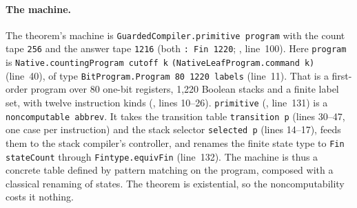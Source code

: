 \paragraph{The machine.} The theorem's machine is
\texttt{GuardedCompiler.primitive program} with the count tape
\texttt{256} and the answer tape \texttt{1216} (both \texttt{: Fin 1220};
, line~100). Here \texttt{program}
is \texttt{Native.countingProgram cutoff k} \texttt{(NativeLeafProgram.command k)}
(line~40), of type \texttt{BitProgram.Program 80 1220 labels} (line~11). That is a
first-order program over 80 one-bit registers, 1,220 Boolean stacks and
a finite label set, with twelve instruction kinds
(, lines 10--26). \texttt{primitive}
(, line~131) is a
\texttt{noncomputable abbrev}. It takes the transition table
\texttt{transition p} (lines 30--47, one case per instruction) and the
stack selector \texttt{selected p} (lines 14--17), feeds them to the
stack compiler's controller, and renames the finite state type to
\texttt{Fin stateCount} through \texttt{Fintype.equivFin} (line~132).
The machine is thus a concrete table defined by pattern matching on the
program, composed with a classical renaming of states. The theorem is
existential, so the noncomputability costs it nothing.

